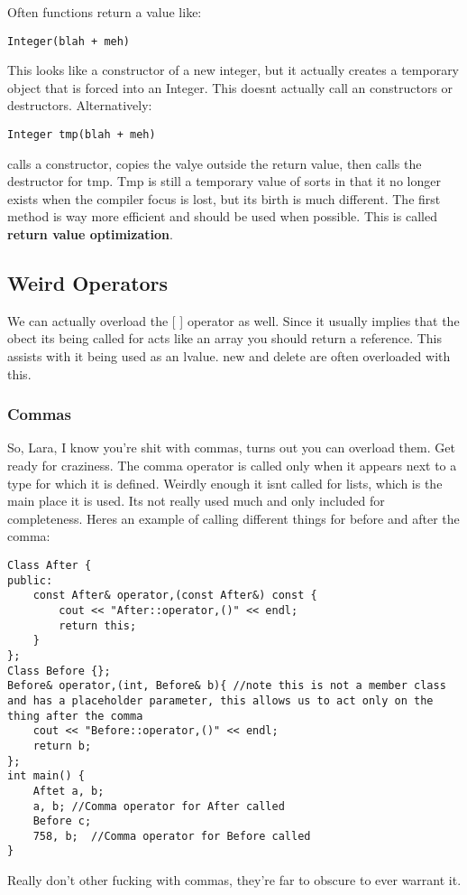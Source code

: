 \documentclass[12pt]{article}
\begin{document}
Often functions return a value like:
\begin{lstlisting}
Integer(blah + meh)
\end{lstlisting}
This looks like a constructor of a new integer, but it actually creates a temporary object that is forced into an Integer. This doesnt actually call an constructors or destructors. Alternatively:
\begin{lstlisting}
Integer tmp(blah + meh)
\end{lstlisting}
calls a constructor, copies the valye outside the return value, then calls the destructor for tmp. Tmp is still a temporary value of sorts in that it no longer exists when the compiler focus is lost, but its birth is much different. The first method is way more efficient and should be used when possible. This is called \textbf{return value optimization}.
\subsection*{Weird Operators}
We can actually overload the [ ] operator as well. Since it usually implies that the obect its being called for acts like an array you should return a reference. This assists with it being used as an lvalue. new and delete are often overloaded with this.

\subsubsection*{Commas}
So, Lara, I know you're shit with commas, turns out you can overload them. Get ready for craziness. The comma operator is called only when it appears next to a type for which it is defined. Weirdly enough it isnt called for lists, which is the main place it is used. Its not really used much and only included for completeness. Heres an example of calling different things for before and after the comma:
\begin{lstlisting}
Class After {
public:
    const After& operator,(const After&) const {
        cout << "After::operator,()" << endl;
        return this;
    }
};
Class Before {};
Before& operator,(int, Before& b){ //note this is not a member class and has a placeholder parameter, this allows us to act only on the thing after the comma
    cout << "Before::operator,()" << endl;
    return b;
};
int main() {
    Aftet a, b;
    a, b; //Comma operator for After called
    Before c;
    758, b;  //Comma operator for Before called
}
\end{lstlisting}
Really don't other fucking with commas, they're far to obscure to ever warrant it.
\end{document}

